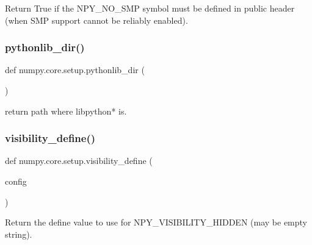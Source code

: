 \begin{DoxyVerb}Return True if the NPY_NO_SMP symbol must be defined in public
header (when SMP support cannot be reliably enabled).\end{DoxyVerb}
 \mbox{\label{namespacenumpy_1_1core_1_1setup_aa5dc208313639a5502fe802cfaf5091a}} 
\subsubsection{\texorpdfstring{pythonlib\+\_\+dir()}{pythonlib\_dir()}}
{\footnotesize\ttfamily def numpy.\+core.\+setup.\+pythonlib\+\_\+dir (\begin{DoxyParamCaption}{ }\end{DoxyParamCaption})}

\begin{DoxyVerb}return path where libpython* is.\end{DoxyVerb}
 \mbox{\label{namespacenumpy_1_1core_1_1setup_a51a4d5fdb211a8d1fa6cd7911dad7b49}} 
\subsubsection{\texorpdfstring{visibility\+\_\+define()}{visibility\_define()}}
{\footnotesize\ttfamily def numpy.\+core.\+setup.\+visibility\+\_\+define (\begin{DoxyParamCaption}\item[{}]{config }\end{DoxyParamCaption})}

\begin{DoxyVerb}Return the define value to use for NPY_VISIBILITY_HIDDEN (may be empty
string).\end{DoxyVerb}
 \mbox{\label{namespacenumpy_1_1core_1_1setup_a13de468764d4414e2994466d67bbd992}} 
